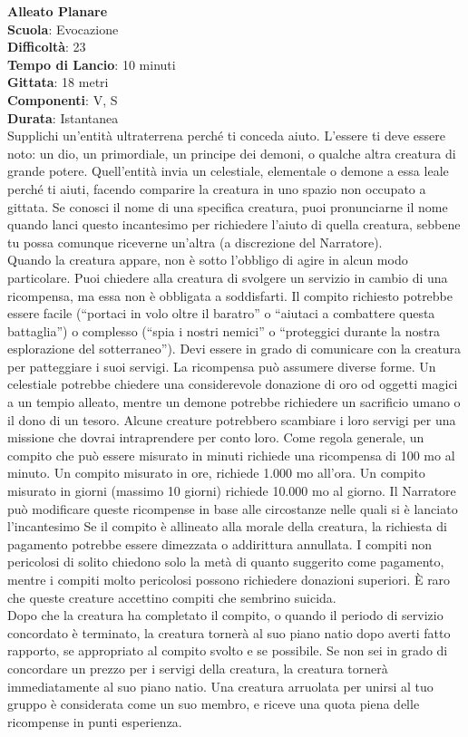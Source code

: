 \begin{multicols}{2}
\medskip\textbf{Alleato Planare}\\
\textbf{Scuola}: Evocazione\\
\textbf{Difficoltà}:  23\\
\textbf{Tempo di Lancio}: 10 minuti\\
\textbf{Gittata}: 18 metri\\
\textbf{Componenti}: V, S\\
\textbf{Durata}: Istantanea\\
Supplichi un'entità ultraterrena perché ti conceda aiuto. L'essere ti deve essere noto: un dio, un primordiale, un principe dei demoni, o qualche altra creatura di grande potere. Quell'entità invia un celestiale, elementale o demone a essa leale perché ti aiuti, facendo comparire la creatura in uno spazio non occupato a gittata. Se conosci il nome di una specifica creatura, puoi pronunciarne il nome quando lanci questo incantesimo per richiedere l'aiuto di quella creatura, sebbene tu possa comunque riceverne un'altra (a discrezione del Narratore).\\
Quando la creatura appare, non è sotto l'obbligo di agire in alcun modo particolare. Puoi chiedere alla creatura di svolgere un servizio in cambio di una ricompensa, ma essa non è obbligata a soddisfarti. Il compito richiesto potrebbe essere facile (“portaci in volo oltre il baratro” o “aiutaci a combattere questa battaglia”) o complesso (“spia i nostri nemici” o “proteggici durante la nostra esplorazione del sotterraneo”). Devi essere in grado di comunicare con la creatura per patteggiare i suoi servigi. La ricompensa può assumere diverse forme. Un celestiale potrebbe chiedere una considerevole donazione di oro od oggetti magici a un tempio alleato, mentre un demone potrebbe richiedere un sacrificio umano o il dono di un tesoro. Alcune creature potrebbero scambiare i loro servigi per una missione che dovrai intraprendere per conto loro. Come regola generale, un compito che può essere misurato in minuti richiede una ricompensa di 100 mo al minuto. Un compito misurato in ore, richiede 1.000 mo all'ora. Un compito misurato in giorni (massimo 10 giorni) richiede 10.000 mo al giorno. Il Narratore può modificare queste ricompense in base alle circostanze nelle quali si è lanciato l'incantesimo Se il compito è allineato alla morale della creatura, la richiesta di pagamento potrebbe essere dimezzata o addirittura annullata. I compiti non pericolosi di solito chiedono solo la metà di quanto suggerito come pagamento, mentre i compiti molto pericolosi possono richiedere donazioni superiori. È raro che queste creature accettino compiti che sembrino suicida.\\
Dopo che la creatura ha completato il compito, o quando il periodo di servizio concordato è terminato, la creatura tornerà al suo piano natio dopo averti fatto rapporto, se appropriato al compito svolto e se possibile. Se non sei in grado di concordare un prezzo per i servigi della creatura, la creatura tornerà immediatamente al suo piano natio. Una creatura arruolata per unirsi al tuo gruppo è considerata come un suo membro, e riceve una quota piena delle ricompense in punti esperienza.


\end{multicols}
